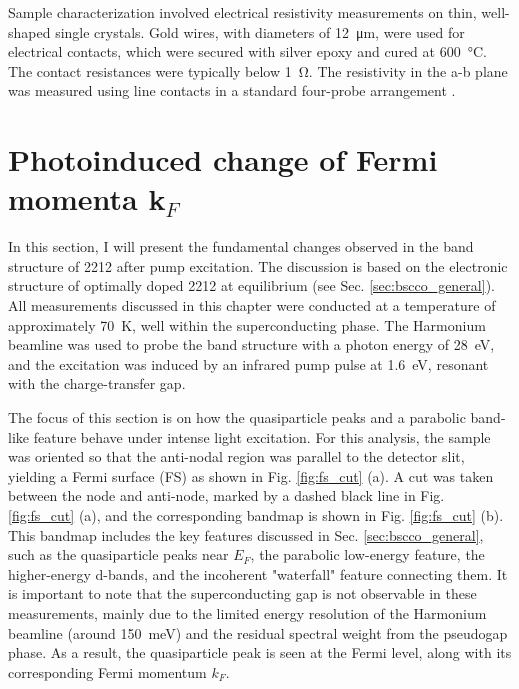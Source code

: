 Sample characterization involved electrical resistivity measurements on thin, well-shaped single crystals. Gold wires, with diameters of \qty{12}{\micro\meter}, were used for electrical contacts, which were secured with silver epoxy and cured at \qty{600}{\degreeCelsius}. The contact resistances were typically below \qty{1}{\ohm}. The resistivity in the a-b plane was measured using line contacts in a standard four-probe arrangement \cite{kendziora_composition_1992}.

\section{Photoinduced change of Fermi momenta k$_F$}
\label{sec:larger_effect}

In this section, I will present the fundamental changes observed in the band structure of 2212 after pump excitation.
The discussion is based on the electronic structure of optimally doped 2212 at equilibrium (see Sec. \ref{sec:bscco_general}).
All measurements discussed in this chapter were conducted at a temperature of approximately \qty{70}{\kelvin}, well within the superconducting phase.
The Harmonium beamline \cite{arrell_harmonium_2017} was used to probe the band structure with a photon energy of \qty{28}{\electronvolt}, and the excitation was induced by an infrared pump pulse at \qty{1.6}{\electronvolt}, resonant with the charge-transfer gap.

The focus of this section is on how the quasiparticle peaks and a parabolic band-like feature behave under intense light excitation.
For this analysis, the sample was oriented so that the anti-nodal region was parallel to the detector slit, yielding a Fermi surface (FS) as shown in Fig. \ref{fig:fs_cut} (a).
A cut was taken between the node and anti-node, marked by a dashed black line in Fig. \ref{fig:fs_cut} (a), and the corresponding bandmap is shown in Fig. \ref{fig:fs_cut} (b).
This bandmap includes the key features discussed in Sec. \ref{sec:bscco_general}, such as the quasiparticle peaks near $E_F$, the parabolic low-energy feature, the higher-energy  d-bands, and the incoherent "waterfall" feature connecting them.
It is important to note that the superconducting gap is not observable in these measurements, mainly due to the limited energy resolution of the Harmonium beamline (around \qty{150}{\milli\electronvolt}) and the residual spectral weight from the pseudogap phase.
As a result, the quasiparticle peak is seen at the Fermi level, along with its corresponding Fermi momentum $k_F$.

